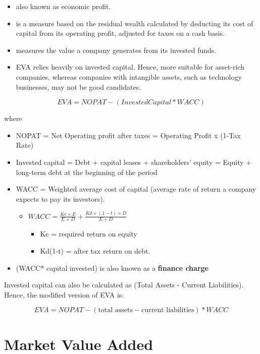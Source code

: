\documentclass[
]{book}
\providecommand{\tightlist}{%
  \setlength{\itemsep}{0pt}\setlength{\parskip}{0pt}}
\begin{document}
\begin{itemize}
\tightlist
\item
  also known as economic profit.
\item
  is a measure based on the residual wealth calculated by deducting its cost of capital from its operating profit,
  adjusted for taxes on a cash basis.
\item
  measures the value a company generates from its invested funds.
\item
  EVA relies heavily on invested capital. Hence, more suitable for asset-rich companies, whereas companies with
  intangible assets, such as technology businesses, may not be good candidates.
\end{itemize}

\[
EVA = NOPAT - (Invested Capital * WACC)
\]

where

\begin{itemize}
\item
  NOPAT = Net Operating profit after taxes = Operating Profit x (1-Tax Rate)
\item
  Invested capital = Debt + capital leases + shareholders' equity = Equity + long-term debt at the beginning of the
  period
\item
  WACC = Weighted average cost of capital (average rate of return a company expects to pay its investors).

  \begin{itemize}
  \item
    \(WACC = \frac{Ke \times E}{E+D} + \frac{Kd \times (1-t) \times D}{E +D }\)

    \begin{itemize}
    \tightlist
    \item
      Ke = required return on equity
    \item
      Kd(1-t) = after tax return on debt.
    \end{itemize}
  \end{itemize}
\item
  (WACC* capital invested) is also known as a \textbf{finance charge}
\end{itemize}

Invested capital can also be calculated as (Total Assets - Current Liabilities). Hence, the modified version of EVA is:

\[
EVA = NOPAT - (\text{total assets} - \text{current liabilities}) * WACC
\]

\hypertarget{market-value-added}{%
\section{Market Value Added}\label{market-value-added}}
\end{document}

